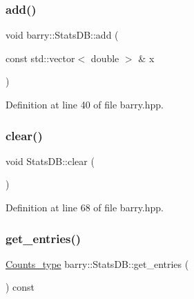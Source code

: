 \subsubsection{\texorpdfstring{add()}{add()}}
{\footnotesize\ttfamily void barry\+::\+Stats\+D\+B\+::add (\begin{DoxyParamCaption}\item[{const std\+::vector$<$ double $>$ \&}]{x }\end{DoxyParamCaption})\hspace{0.3cm}{\ttfamily [inline]}}



Definition at line 40 of file barry.\+hpp.

\mbox{\label{classbarry_1_1_stats_d_b_a5de68def55b0a3b99a8f609815624a00}} 
\subsubsection{\texorpdfstring{clear()}{clear()}}
{\footnotesize\ttfamily void Stats\+D\+B\+::clear (\begin{DoxyParamCaption}{ }\end{DoxyParamCaption})\hspace{0.3cm}{\ttfamily [inline]}}



Definition at line 68 of file barry.\+hpp.

\mbox{\label{classbarry_1_1_stats_d_b_a396e0921c34a854320a8027ce0f29278}} 
\subsubsection{\texorpdfstring{get\+\_\+entries()}{get\_entries()}}
{\footnotesize\ttfamily \hyperlink{namespacebarry_a3e2d8c3b6cf602107559d4237d9f1315}{Counts\+\_\+type} barry\+::\+Stats\+D\+B\+::get\+\_\+entries (\begin{DoxyParamCaption}{ }\end{DoxyParamCaption}) const\hspace{0.3cm}{\ttfamily [inline]}}



